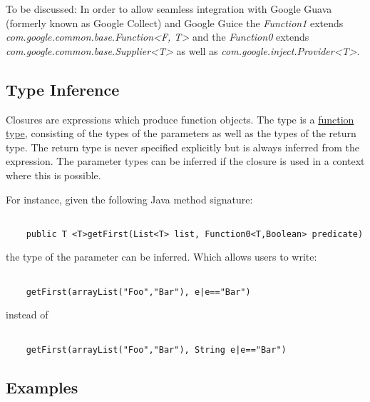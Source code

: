 \documentclass[a4paper,10pt]{scrreprt}
\begin{document}
To be discussed: In order to allow seamless integration with Google Guava (formerly known as Google Collect) and Google Guice the \emph{Function1} extends \emph{com.google.common.base.Function<F, T>} and the
\emph{Function0} extends \emph{com.google.common.base.Supplier<T>} as well as \emph{com.google.inject.Provider<T>}.




\subsection{ Type Inference }
\label{ClosuresTypeInference}

Closures are expressions which produce function objects. The type is a 
\hyperref[FunctionTypes]{function type}, consisting of the types of the parameters as well as the types of the return type.
The return type is never specified explicitly but is always inferred from the expression. The parameter types can be inferred if the closure is used in a context where this is possible.

For instance, given the following Java method signature:

\begin{lstlisting}

	public T <T>getFirst(List<T> list, Function0<T,Boolean> predicate) 

\end{lstlisting}
 

the type of the parameter can be inferred. Which allows users to write:

\begin{lstlisting}

	getFirst(arrayList("Foo","Bar"), e|e=="Bar")

\end{lstlisting}

instead of 

\begin{lstlisting}

	getFirst(arrayList("Foo","Bar"), String e|e=="Bar")

\end{lstlisting}





\subsection{ Examples }
\end{document}
